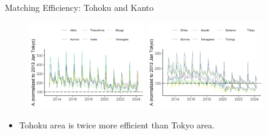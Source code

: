 \documentclass[aspectratio=169]{beamer}
\begin{document}
\begin{frame}{Matching Efficiency: Tohoku and Kanto}
\begin{figure}[!ht]
  \begin{center}

  \includegraphics[width = 0.45\textwidth]
  {figuretable/matching_efficiency_month_aggregate_tohoku.png}
  \includegraphics[width = 0.45\textwidth]
  {figuretable/matching_efficiency_month_aggregate_kanto.png}
  \end{center}
  \footnotesize
\end{figure} 
\begin{itemize}
    \item Tohoku area is twice more efficient than Tokyo area.
\end{itemize}
\end{frame}
\end{document}
